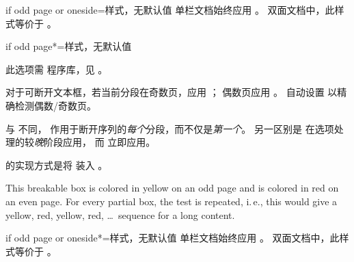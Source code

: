 \begin{docTcbKey}[][doc new=2016-11-18]{if odd page or oneside}{=}{样式，无默认值}
  单栏文档始终应用 。
  双面文档中，此样式等价于 。
\end{docTcbKey}


\clearpage
\begin{docTcbKey}[][doc new=2015-11-13]{if odd page*}{=}{样式，无默认值}
\begin{marker}
此选项需  程序库，见 。
\end{marker}
对于可断开文本框，若当前分段在奇数页，应用 ；
偶数页应用 。
自动设置  以精确检测偶数/奇数页。

与  不同，
作用于断开序列的\emph{每个}分段，而不仅是\emph{第一个}。
另一区别是  在选项处理的较\emph{晚}阶段应用，
而  立即应用。

 的实现方式是将 
装入 。

\begin{dispExample}
\begin{tcolorbox}[breakable,if odd page*={colback=yellow!50}{colback=red!50}]
  This breakable box is colored in yellow on an odd page
  and is colored in red on an even page. For every partial box, the
  test is repeated, i.\,e., this would give a yellow, red, yellow, red, \ldots\
  sequence for a long content.
\end{tcolorbox}
\end{dispExample}
\end{docTcbKey}


\begin{docTcbKey}[][doc new=2016-11-18]{if odd page or oneside*}{=}{样式，无默认值}
  单栏文档始终应用 \meta{奇数选项}。
  双面文档中，此样式等价于 。
\end{docTcbKey}


